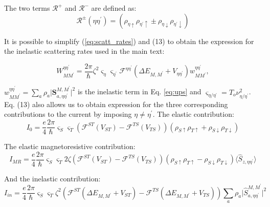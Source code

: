 \documentclass[reprint,amsmath,amssymb,aps,nofootinbib,onecolumn]{revtex4-2}
\begin{document}
The two terms $\mathcal{R}^{+}$ and $\mathcal{R}^{-}$ are defined as:
\begin{equation}
    \mathcal{R}^{\pm}(\eta\eta^{\prime})=\left( \rho_{\eta \uparrow} \rho_{\eta^{\prime}\uparrow} \pm \rho_{\eta \downarrow} \rho_{\eta^{\prime}\downarrow} \right)
    \label{eq:R_+-}
\end{equation}

It is possible to simplify (\ref{eq:scatt_rates}) and (13) to obtain the expression for the inelastic scattering rates used in the main text:

\begin{equation}
    W_{MM^{\prime}}^{\eta \eta^{\prime}}=\dfrac{2\pi}{\hbar} \zeta^2 \varsigma_{\eta} \varsigma_{\eta^{\prime}} \mathcal{F}^{\eta\eta^{\prime}}(\Delta E_{M,M^{\prime}}+V_{\eta \eta^{\prime}} )  w_{MM^{\prime}}^{\eta \eta^{\prime}},
    \label{eq:elec_rates}
\end{equation}

 $w_{MM^{\prime}}^{\eta \eta^{\prime}} = \sum_{a} \rho_a \lvert {\textbf{S}_{a,\eta\eta^{\prime}}^{M,M^{\prime}}}\rvert^{2}$ is the inelastic term in Eq. \ref{eq:ups} and $\varsigma_{\eta/\eta^{\prime}} = T_o \nu^2_{\eta/\eta^{\prime}}$. Eq. (13) also allows us to obtain expression for the three corresponding contributions to the current by imposing $\eta \neq \eta^{\prime} $.
The elastic contribution:
\begin{equation}
I_0=\dfrac{e}{4} \dfrac{2\pi}{\hbar}  \varsigma_{S} \varsigma_{T} \left( \mathcal{F}^{ST}(V_{ST})-\mathcal{F}^{TS}(V_{TS}) \right) \left( \rho_{S \uparrow} \rho_{T\uparrow} + \rho_{S \downarrow} \rho_{T\downarrow} \right)
\label{eq:I_0}
\end{equation}

The elastic magnetoresistive contribution:
\begin{equation}
I_{MR}=\dfrac{e}{4} \dfrac{2\pi}{\hbar}\varsigma_{S} \varsigma_{T}  2 \zeta  \left( \mathcal{F}^{ST}(V_{ST})-\mathcal{F}^{TS}(V_{TS}) \right) \left( \rho_{S \uparrow} \rho_{T\uparrow} - \rho_{S \downarrow} \rho_{T\downarrow} \right) \langle \hat{S}_{z,\eta\eta^{\prime}} \rangle
\label{eq:I_MR}
\end{equation}

And the inelastic contribution:
\begin{equation}
I_{in}=\dfrac{e}{4} \dfrac{2\pi}{\hbar}\varsigma_{S} \varsigma_{T} \zeta^2  \left( \mathcal{F}^{ST}(\Delta E_{M,M^{\prime}}+V_{ST})-\mathcal{F}^{TS}(\Delta E_{M,M^{\prime}}+V_{TS}) \right) \sum_{a} \rho_a \lvert {\hat{S}_{a,\eta\eta^{\prime}}^{M,M^{\prime}}}\rvert^{2}
\label{eq:I_in}
\end{equation}
\end{document}
